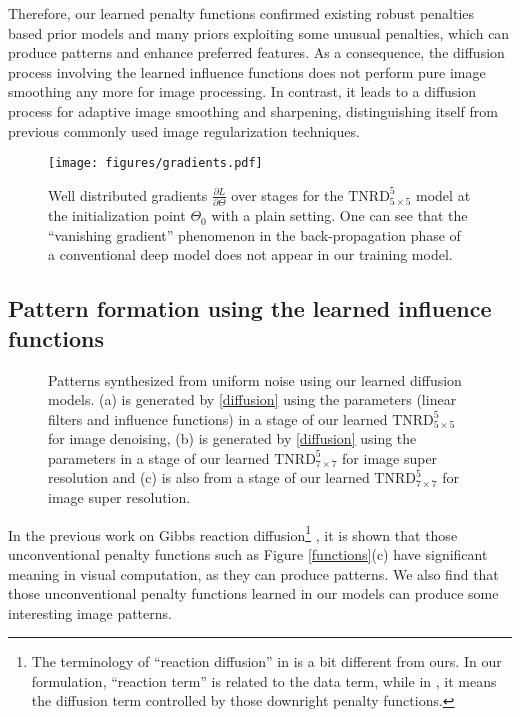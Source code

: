 \documentclass[10pt,journal,compsoc]{IEEEtran}
\begin{document}
{Therefore, our learned penalty functions confirmed existing robust penalties based 
prior models and many priors exploiting some unusual penalties, which  
can produce patterns and enhance preferred features.} 
As a consequence, the diffusion process involving the learned 
influence functions does not perform 
pure image smoothing any more for image processing. 
In contrast, it leads to a diffusion process for adaptive image smoothing 
and sharpening, distinguishing itself from previous commonly used image regularization techniques. 

\begin{figure*}[t!]
\centering
\hspace*{-1.5cm} {\texttt{[image: figures/gradients.pdf]}}
\vspace*{-0.25cm}
\caption{Well distributed gradients $\frac{\partial L}{\partial \Theta}$ 
over stages for the $\text{TNRD}_{5 \times 5}^5$ model at the initialization point $\Theta_0$ with a plain setting. 
{One can see that the ``vanishing gradient'' phenomenon 
\cite{bengio1994learning} in the back-propagation phase 
of a conventional deep model does not appear in our training 
model.}}\label{fig:gradients}
\end{figure*}
\subsection{Pattern formation using the learned influence 
functions}\label{sec:patterns}
\begin{figure}[t!]
\centering
{}\hfill
{}\hfill
{}
\vspace*{-0.25cm}
\caption{Patterns synthesized from uniform noise 
using our learned diffusion models. (a) is generated by \eqref{diffusion} using 
the parameters (linear filters and influence functions) in a stage of our learned $\text{TNRD}_{5 \times 5}^5$ 
for image denoising, (b) is generated by \eqref{diffusion} using 
the parameters in a stage of our learned $\text{TNRD}_{7 \times 7}^5$ for image super resolution and 
(c) is also from a stage of our learned $\text{TNRD}_{7 \times 7}^5$ for image super resolution.}\label{patterns}
\vspace*{-0.5cm}
\end{figure}

In the previous work on Gibbs reaction diffusion\footnote{The terminology of ``reaction diffusion'' in \cite{zhu1997prior} is a bit 
different from ours. In our formulation, ``reaction term'' is related to the data term, while in \cite{zhu1997prior}, it means 
the diffusion term controlled by those downright penalty functions.} 
\cite{zhu1997prior}, it is shown that those unconventional penalty functions 
such as Figure \ref{functions}(c) have significant meaning in visual computation, as they can produce patterns. 
We also find that those unconventional penalty functions learned in our models 
can produce some interesting image patterns. 
\end{document}
